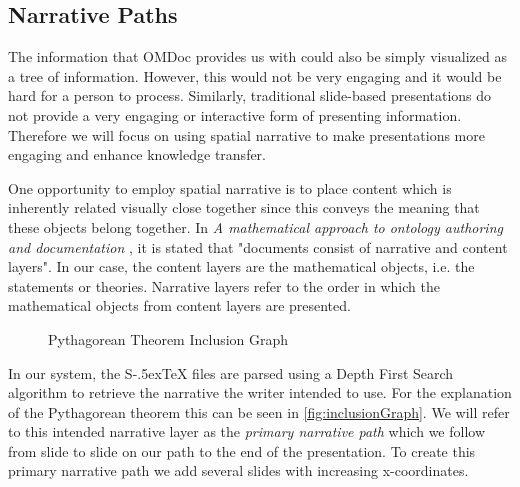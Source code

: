\documentclass{llncs}
\def\stex{\texorpdfstring{\raisebox{-.5ex}S\kern-.5ex\TeX}{sTeX}\xspace}
\begin{document}
\subsection{Narrative Paths}
\label{sec:narrativePaths}

The information that OMDoc provides us with could also be simply visualized as a tree of information. However, this would not be very engaging and it would be hard for a person to process. Similarly, traditional slide-based presentations do not provide a very engaging or interactive form of presenting information. Therefore we will focus on using spatial narrative to make presentations more engaging and enhance knowledge transfer. 

One opportunity to employ spatial narrative is to place content which is inherently related visually close together since this conveys the meaning that these objects belong together. In \textit{A mathematical approach to ontology authoring and documentation} \cite{LK:MathOntoAuthDoc09}, it is stated that "documents consist of narrative and content layers". In our case, the content layers are the mathematical objects, i.e. the statements or theories. Narrative layers refer to the order in which the mathematical objects from content layers are presented.

\begin{figure}[ht]\vspace{-1.5em}
  \vspace{-1.5em}
  \caption{Pythagorean Theorem Inclusion Graph}\label{fig:inclusionGraph}
\vspace{-2em}
\end{figure}

In our system, the \stex files are parsed using a Depth First Search algorithm to retrieve the narrative the writer intended to use. For the explanation of the Pytha\-go\-rean theorem this can be seen in \autoref{fig:inclusionGraph}. We will refer to this intended narrative layer as the \textit{primary narrative path} which we follow from slide to slide on our path to the end of the presentation. To create this primary narrative path we add several slides with increasing x-coordinates.
\end{document}
